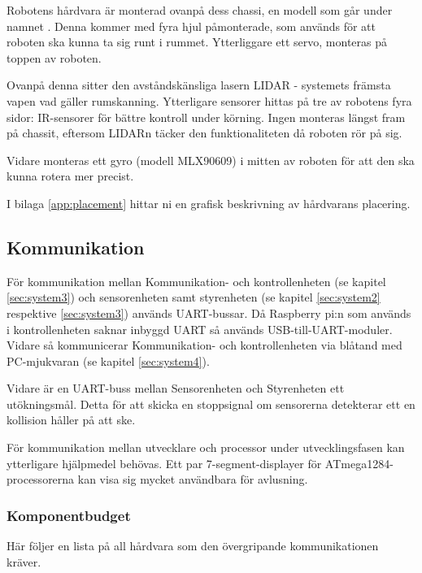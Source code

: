 \documentclass[a4paper,11pt]{article}
\begin{document}
\noindent
Robotens hårdvara är monterad ovanpå dess chassi, en modell som går under namnet \cite{terminator}. Denna kommer med fyra hjul påmonterade, som används för att roboten ska kunna ta sig runt i rummet. Ytterliggare ett servo, monteras på toppen av roboten.

Ovanpå denna sitter den avståndskänsliga lasern LIDAR - systemets främsta vapen vad gäller rumskanning. Ytterligare sensorer hittas på tre av robotens fyra sidor: IR-sensorer för bättre kontroll under körning. Ingen monteras längst fram på chassit, eftersom LIDARn täcker den funktionaliteten då roboten rör på sig.

Vidare monteras ett gyro (modell MLX90609) i mitten av roboten för att den ska kunna rotera mer precist.

I bilaga \ref{app:placement} hittar ni en grafisk beskrivning av hårdvarans placering.

\subsection{Kommunikation}
För kommunikation mellan Kommunikation- och kontrollenheten (se kapitel \ref{sec:system3}) och sensorenheten samt styrenheten (se kapitel \ref{sec:system2} respektive \ref{sec:system3}) används UART-bussar. Då Raspberry pi:n som används i kontrollenheten saknar inbyggd UART så används USB-till-UART-moduler. Vidare så kommunicerar Kommunikation- och kontrollenheten via blåtand med PC-mjukvaran (se kapitel \ref{sec:system4}).

Vidare är en UART-buss mellan Sensorenheten och Styrenheten ett utökningsmål. Detta för att skicka en stoppsignal om sensorerna detekterar ett en kollision håller på att ske.

För kommunikation mellan utvecklare och processor under utvecklingsfasen kan ytterligare hjälpmedel behövas. Ett par 7-segment-displayer för ATmega1284-processorerna kan visa sig mycket användbara för avlusning.

\subsubsection{Komponentbudget}
Här följer en lista på all hårdvara som den övergripande kommunikationen kräver.

\begin{center}
\begin{HardwareList}
\end{HardwareList}
\end{center}
\end{document}
